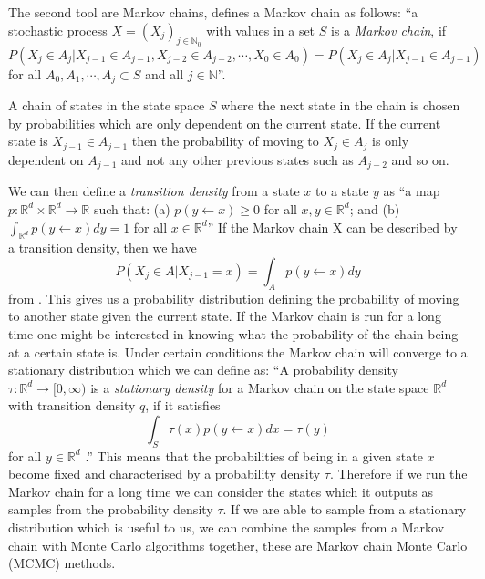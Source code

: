 \documentclass[11pt,a4paper]{report}
\begin{document}
The second tool are Markov chains, \citet{Voss14} defines a Markov chain as follows:  
``a stochastic process $X=(X_j)_{j\in \mathbb{N}_0}$ with values in a set $S$ is a \emph{Markov chain}, if
\begin{equation}
P(X_j \in A_j | X_{j-1} \in A_{j-1}, X_{j-2} \in A_{j-2}, \cdots, X_0 \in A_0) = P(X_j \in A_j | X_{j-1} \in A_{j-1})
\end{equation}
for all $A_0, A_1, \cdots,A_j \subset S$ and all $j \in \mathbb{N}$''.

A chain of states in the state space $S$ where the next state in the chain is chosen by probabilities which are only dependent on the current state. If the current state is $X_{j-1} \in A_{j-1}$ then the probability of moving to $X_j \in A_j$ is only dependent on $A_{j-1}$ and not any other previous states such as $A_{j-2}$ and so on. 

We can then define a \emph{transition density} from a state $x$ to a state $y$ as ``a map $p: \mathbb{R}^d \times \mathbb{R}^d \rightarrow \mathbb{R}$ such that: \newline
(a) $p(y \leftarrow x) \geq 0$ for all $x,y \in \mathbb{R}^d$; and \newline
(b) $\int_{\mathbb{R}^d} p(y \leftarrow x) dy = 1$ for all $x \in \mathbb{R}^d$'' \newline
If the Markov chain X can be described by a transition density, then we have 
\begin{equation}
P(X_j \in A | X_{j-1} = x) = \int_A p(y \leftarrow x)dy
\end{equation}
from \citet{Voss14}.
This gives us a probability distribution defining the probability of moving to another state given the current state. If the Markov chain is run for a long time one might be interested in knowing what the probability of the chain being at a certain state is. Under certain conditions the Markov chain will converge to a stationary distribution which we can define as: ``A probability density $\tau:\mathbb{R}^{d} \rightarrow [0,\infty)$ is a \emph{stationary density} for a Markov chain on the state space $\mathbb{R}^d$ with transition density $q$, if it satisfies
\begin{equation}
\int_S \tau(x)p(y \leftarrow x)dx = \tau(y)
\end{equation}
for all $y \in \mathbb{R}^d$ \citep{Voss14}.'' 
This means that the probabilities of being in a given state $x$ become fixed and characterised by a probability density $\tau$. Therefore if we run the Markov chain for a long time we can consider the states which it outputs as samples from the probability density $\tau$. If we are able to sample from a stationary distribution which is useful to us, we can combine the samples from a Markov chain with Monte Carlo algorithms together, these are Markov chain Monte Carlo (MCMC) methods.
\end{document}
